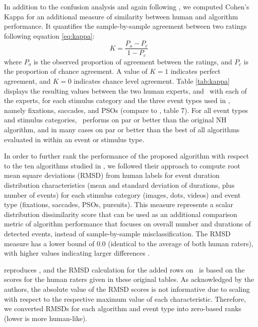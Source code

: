 In addition to the confusion analysis and again following \citet{Andersson2017},
we computed Cohen's Kappa \citep{cohen1960coefficient} for an additional measure
of similarity between human and algorithm performance. It quantifies the
sample-by-sample agreement between two ratings following equation \ref{eq:kappa}:
%
\begin{equation}\label{eq:kappa}
K = \frac{P_o - P_c}{1- P_c}
\end{equation}
%
where $P_o$ is the observed proportion of agreement between the ratings, and
$P_c$ is the proportion of chance agreement. A value of $K=1$ indicates perfect
agreement, and $K=0$ indicates chance level agreement.
Table \ref{tab:kappa} displays the resulting values
between the two human experts, and \remodnav\ with each of the experts, for
each stimulus category and the three event types used in \citet{Andersson2017},
namely fixations, saccades, and PSOs (compare to \citet{Andersson2017}, table 7).
For all event types and stimulus categories, \remodnav\ performs on par or better
than the original NH algorithm, and in many cases on par or better than the best
of all algorithms evaluated in \citet{Andersson2017} within an event or stimulus type.

In order to further rank the performance of the proposed algorithm with respect
to the ten algorithms studied in \citet{Andersson2017}, we followed their
approach to compute root mean square deviations (RMSD) from human labels for
event duration distribution characteristics (mean and standard deviation of
durations, plus number of events) for each stimulus category (images, dots,
videos) and event type (fixations, saccades, PSOs, pursuits). This measure
represents a scalar distribution dissimilarity score that can be used as an
additional comparison metric of algorithm performance that focuses on overall
number and durations of detected events, instead of sample-by-sample
misclassification. The RMSD measure has a lower bound of $0.0$ (identical to
the average of both human raters), with higher values indicating larger
differences \citep[for detail information on the calculation of this metric
see][]{Andersson2017}.

 reproduces \citet[Tables
3-6]{Andersson2017}, and the RMSD calculation for the added rows on \remodnav\
is based on the scores for the human raters given in these original tables. As
acknowledged by the authors, the absolute value of the RMSD scores is not
informative due to scaling with respect to the respective maximum value of each
characteristic.  Therefore, we converted RMSDs for each algorithm and event
type into zero-based ranks (lower is more human-like).

